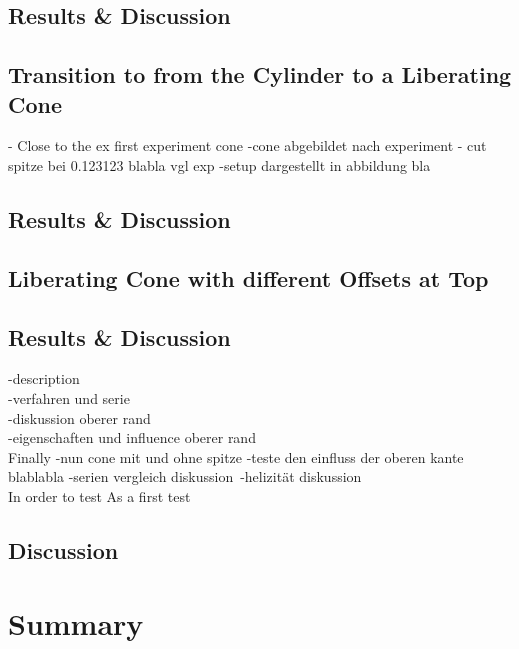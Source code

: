 \subsection{Results \& Discussion}


\clearpage

\subsection{Transition to from the Cylinder to a Liberating Cone}

 - Close to the ex
first experiment cone
-cone abgebildet nach experiment
- cut spitze bei 0.123123 blabla vgl exp
-setup dargestellt in abbildung bla

\subsection{Results \& Discussion}

\clearpage

\subsection{Liberating Cone with different Offsets at Top}
\subsection{Results \& Discussion}

-description\\
-verfahren und serie\\
-diskussion oberer rand\\
-eigenschaften und influence oberer rand \\


Finally
-nun cone mit und ohne spitze
-teste den einfluss der oberen kante blablabla
-serien vergleich diskussion\
-helizität diskussion\\

In order to test
As a first test

\subsection{Discussion}
\section{Summary}

